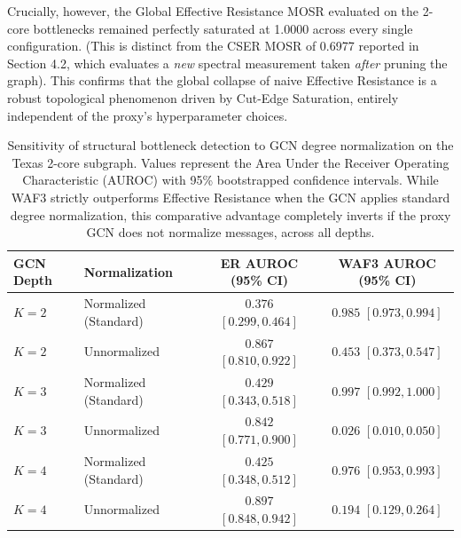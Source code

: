 \documentclass[10pt]{article} %
\begin{document}
Crucially, however, the Global Effective Resistance MOSR evaluated on the 2-core bottlenecks remained perfectly saturated at 1.0000 across every single configuration. (This is distinct from the CSER MOSR of 0.6977 reported in Section 4.2, which evaluates a \textit{new} spectral measurement taken \textit{after} pruning the graph). This confirms that the global collapse of naive Effective Resistance is a robust topological phenomenon driven by Cut-Edge Saturation, entirely independent of the proxy's hyperparameter choices.
\begin{table}[h]
\centering
\begin{tabular}{llcc}
\toprule
\textbf{GCN Depth} & \textbf{Normalization} & \textbf{ER AUROC (95\% CI)} & \textbf{WAF3 AUROC (95\% CI)} \\
\midrule
$K=2$ & Normalized (Standard) & $0.376$ $[0.299, 0.464]$ & $0.985$ $[0.973, 0.994]$ \\
$K=2$ & Unnormalized          & $0.867$ $[0.810, 0.922]$ & $0.453$ $[0.373, 0.547]$ \\
\midrule
$K=3$ & Normalized (Standard) & $0.429$ $[0.343, 0.518]$ & $0.997$ $[0.992, 1.000]$ \\
$K=3$ & Unnormalized          & $0.842$ $[0.771, 0.900]$ & $0.026$ $[0.010, 0.050]$ \\
\midrule
$K=4$ & Normalized (Standard) & $0.425$ $[0.348, 0.512]$ & $0.976$ $[0.953, 0.993]$ \\
$K=4$ & Unnormalized          & $0.897$ $[0.848, 0.942]$ & $0.194$ $[0.129, 0.264]$ \\
\bottomrule
\end{tabular}
\caption{Sensitivity of structural bottleneck detection to GCN degree normalization on the Texas 2-core subgraph. Values represent the Area Under the Receiver Operating Characteristic (AUROC) with 95\% bootstrapped confidence intervals. While WAF3 strictly outperforms Effective Resistance when the GCN applies standard degree normalization, this comparative advantage completely inverts if the proxy GCN does not normalize messages, across all depths.}
\label{tab:jacobian_sensitivity}
\end{table}
\end{document}
